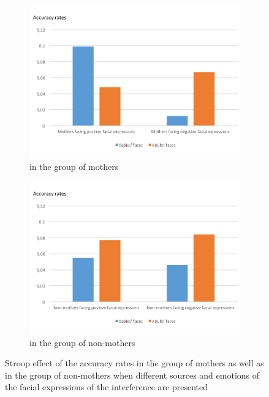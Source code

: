 \begin{figure}[!t]
  \centering
  \begin{subfigure}[b]{0.9\linewidth}
    \includegraphics[width=\linewidth]{pictures/ACC_facialexp_identity.png}
    \caption{in the group of mothers}
  \end{subfigure}
  \begin{subfigure}[b]{0.9\linewidth}
    \includegraphics[width=\linewidth]{pictures/ACC_Nonmother_identity_facialexp.png}
    \caption{in the group of non-mothers}
  \end{subfigure}
  \caption{Stroop effect of the accuracy rates in the group of mothers as well as in the group of non-mothers when different sources and emotions of the facial expressions of the interference are presented}
  \label{fig.results.add}
\end{figure}





